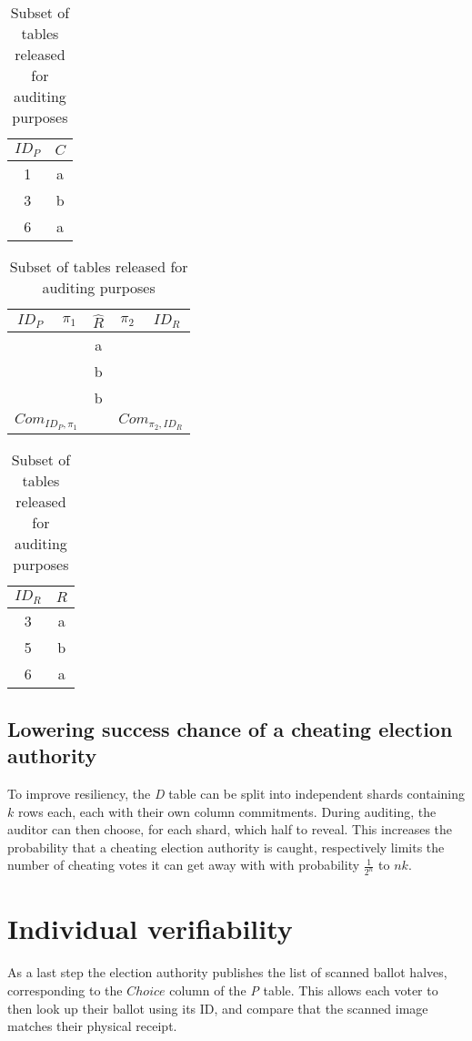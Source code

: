 \begin{table}
	\centering
	\begin{subtable}{.2\linewidth}
	\end{subtable}%
		\centering
		\begin{tabular}{|c|c|}
			\hline
			$ID_P$ & $C$ \\
			\hline
			1 & a \\
			3 & b \\
			6 & a \\
			\hline
		\end{tabular}
	\begin{subtable}{.6\linewidth}
		\centering
		\begin{tabular}{|c|c|c|c|c|}
			\hline
			$ID_P$ & $\pi_1$ & $\hat{R}$ & $\pi_2$ & $ID_R$ \\
			\hline
			  &                     & a &                     &   \\
			  &                     & b &                     &   \\
			  &                     & b &                     &   \\
			\hline
			\multicolumn{2}{|c|}{$Com_{ID_P, \pi_1}$} &   & \multicolumn{2}{c|}{$Com_{\pi_2, ID_R}$} \\
			\hline
		\end{tabular}
	\end{subtable}
	\begin{subtable}{.2\linewidth}
		\centering
		\begin{tabular}{|c|c|}
			\hline
			$ID_R$ & $R$ \\
			\hline
			3 & a \\
			5 & b \\
			6 & a \\
			\hline
		\end{tabular}
	\end{subtable}
	\caption{Subset of tables released for auditing purposes}
	\label{tbl:decryption_audit}
\end{table}

\subsection{Lowering success chance of a cheating election authority}

To improve resiliency, the \emph{D} table can be split into independent shards
containing $k$ rows each, each with their own column commitments. During
auditing, the auditor can then choose, for each shard, which half to reveal.
This increases the probability that a cheating election authority is caught,
respectively limits the number of cheating votes it can get away with with
probability $\frac{1}{2^n}$ to $nk$.


\section{Individual verifiability}

As a last step the election authority publishes the list of scanned ballot
halves, corresponding to the $Choice$ column of the \emph{P} table. This allows
each voter to then look up their ballot using its ID, and compare that the
scanned image matches their physical receipt.
